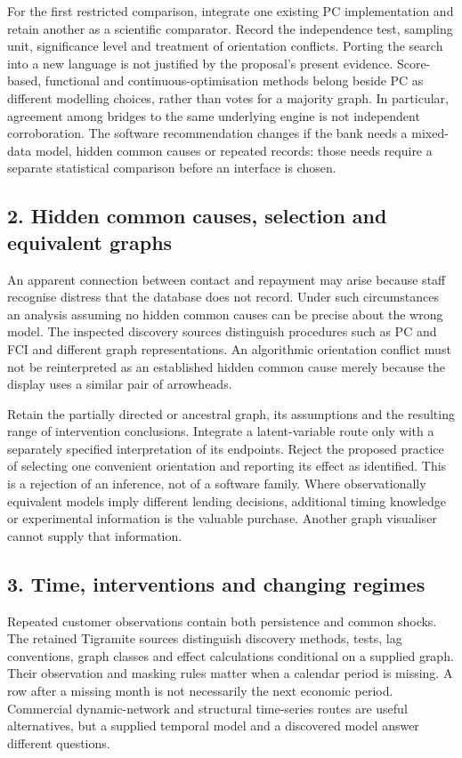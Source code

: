 For the first restricted comparison, integrate one existing PC implementation
and retain another as a scientific comparator. Record the independence test,
sampling unit, significance level and treatment of orientation conflicts.
Porting the search into a new language is not justified by the proposal's
present evidence. Score-based, functional and continuous-optimisation methods
belong beside PC as different modelling choices, rather than votes for a
majority graph. In particular, agreement among bridges to the same underlying
engine is not independent corroboration. The software recommendation changes
if the bank needs a mixed-data model, hidden common causes or repeated records:
those needs require a separate statistical comparison before an interface is
chosen.

\subsection{2. Hidden common causes, selection and equivalent graphs}
An apparent connection between contact and repayment may arise because staff
recognise distress that the database does not record. Under such circumstances
an analysis assuming no hidden common causes can be precise about the wrong
model. The inspected discovery sources distinguish procedures such as PC and
FCI and different graph representations. An algorithmic orientation conflict
must not be reinterpreted as an established hidden common cause merely because
the display uses a similar pair of arrowheads.
\citep{v12_sw_causallearn,exec13_pcalg_reuse_primary}

Retain the partially directed or ancestral graph, its assumptions and the
resulting range of intervention conclusions. Integrate a latent-variable route
only with a separately specified interpretation of its endpoints. Reject the
proposed practice of selecting one convenient orientation and reporting its
effect as identified. This is a rejection of an inference, not of a software
family. Where observationally equivalent models imply different lending
decisions, additional timing knowledge or experimental information is the
valuable purchase. Another graph visualiser cannot supply that information.

\subsection{3. Time, interventions and changing regimes}
Repeated customer observations contain both persistence and common shocks.
The retained Tigramite sources distinguish discovery methods, tests, lag
conventions, graph classes and effect calculations conditional on a supplied
graph. Their observation and masking rules matter when a calendar period is
missing. A row after a missing month is not necessarily the next economic
period. Commercial dynamic-network and structural time-series routes are
useful alternatives, but a supplied temporal model and a discovered model
answer different questions.
\citep{exec23_tigramite_reuse_source,exec13_ct_genie_dbn,exec13_ct_stata_svar}

